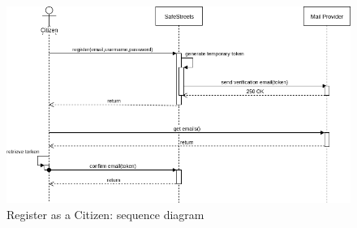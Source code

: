 \documentclass{article}
\begin{document}
\begin{figure}[H]
		\centering
		\includegraphics[width=\linewidth]{Images/Register_Citizen_Sequence_Diagram.png}
		\caption{Register as a Citizen: sequence diagram}
		
	\end{figure}
\end{document}
